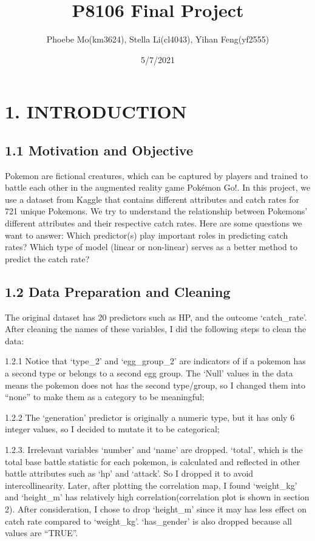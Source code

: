\documentclass[
]{article}
\title{P8106 Final Project}
\author{Phoebe Mo(km3624), Stella Li(cl4043), Yihan Feng(yf2555)}
\date{5/7/2021}
\begin{document}
\maketitle

\hypertarget{introduction}{%
\section{1. INTRODUCTION}\label{introduction}}

\hypertarget{motivation-and-objective}{%
\subsection{1.1 Motivation and
Objective}\label{motivation-and-objective}}

Pokemon are fictional creatures, which can be captured by players and
trained to battle each other in the augmented reality game Pokémon Go!.
In this project, we use a dataset from Kaggle that contains different
attributes and catch rates for 721 unique Pokemons. We try to understand
the relationship between Pokemons' different attributes and their
respective catch rates. Here are some questions we want to answer: Which
predictor(s) play important roles in predicting catch rates? Which type
of model (linear or non-linear) serves as a better method to predict the
catch rate?

\hypertarget{data-preparation-and-cleaning}{%
\subsection{1.2 Data Preparation and
Cleaning}\label{data-preparation-and-cleaning}}

The original dataset has 20 predictors such as HP, and the outcome
`catch\_rate'. After cleaning the names of these variables, I did the
following steps to clean the data:

1.2.1 Notice that `type\_2' and `egg\_group\_2' are indicators of if a
pokemon has a second type or belongs to a second egg group. The `Null'
values in the data means the pokemon does not has the second type/group,
so I changed them into ``none'' to make them as a category to be
meaningful;

1.2.2 The `generation' predictor is originally a numeric type, but it
has only 6 integer values, so I decided to mutate it to be categorical;

1.2.3. Irrelevant variables `number' and `name' are dropped. `total',
which is the total base battle statistic for each pokemon, is calculated
and reflected in other battle attributes such as `hp' and `attack'. So I
dropped it to avoid intercollinearity. Later, after plotting the
correlation map, I found `weight\_kg' and `height\_m' has relatively
high correlation(correlation plot is shown in section 2). After
consideration, I chose to drop `height\_m' since it may has less effect
on catch rate compared to `weight\_kg'. `has\_gender' is also dropped
because all values are ``TRUE''.
\end{document}
